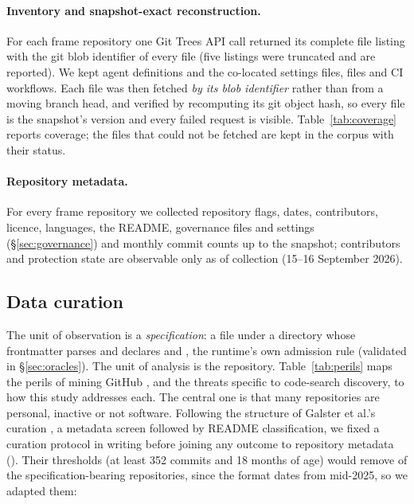\paragraph{Inventory and snapshot-exact reconstruction.} For each frame repository one Git Trees API call returned its
complete file listing with the git blob identifier of every file (five listings were truncated and are reported). We
kept agent definitions and the co-located settings files,  files and CI workflows. Each file was then
fetched \emph{by its blob identifier} rather than from a moving branch head, and verified by recomputing its git object
hash, so every file is the snapshot's version and every failed request is visible. Table~\ref{tab:coverage} reports
coverage; the \nFilesUnavailable{} files that could not be fetched are kept in the corpus with their status.



\paragraph{Repository metadata.} For every frame repository we collected repository flags, dates, contributors,
licence, languages, the README, governance files and settings (\S\ref{sec:governance}) and monthly commit counts up to
the snapshot; contributors and protection state are observable only as of collection (15--16 September 2026).

\subsection{Data curation}
\label{sec:curation}

The unit of observation is a \emph{specification}: a file under a  directory whose frontmatter
parses and declares  and , the runtime's own admission rule (validated in
\S\ref{sec:oracles}). The unit of analysis is the repository. Table~\ref{tab:perils} maps the perils of mining GitHub
\citep{kalliamvakou2016promises}, and the threats specific to code-search discovery, to how this study addresses each.
The central one is that many repositories are personal, inactive or not software. Following the structure of Galster et al.'s curation \citep{Galster2026Dataset}, a metadata screen followed by README
classification, we fixed a curation protocol in writing before joining any outcome to repository metadata
(). Their thresholds (at least 352 commits and 18 months of age) would
remove \pctGalsterReposRemoved{} of the specification-bearing repositories, since the format dates from mid-2025, so we
adapted them:

